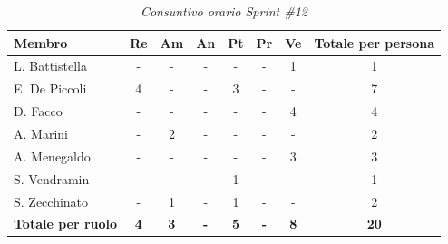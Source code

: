 ﻿\documentclass[a4paper, 10pt, colorlinks=true, linkcolor=black, urlcolor=blue, citecolor=blue, hidelinks]{article}
\renewcommand{\arraystretch}{1.2}
\begin{document}
\begin{table}[H]
    \centering
    \renewcommand{\arraystretch}{1.4}
    \begin{tabular}{|l|c|c|c|c|c|c|c|}
        \hline
        \rowcolor{bluBitless!15}
        \textbf{Membro} & \textbf{Re} & \textbf{Am} & \textbf{An} & \textbf{Pt} & \textbf{Pr} & \textbf{Ve} & \textbf{Totale per persona} \\
        \hline
        L. Battistella & - & - & - & - & - & 1 & 1 \\ \hline
        E. De Piccoli & 4 & - & - & 3 & - & - & 7 \\ \hline
        D. Facco & - & - & - & - & - & 4 & 4 \\ \hline
        A. Marini & - & 2 & - & - & - & - & 2 \\ \hline
        A. Menegaldo & - & - & - & - & - & 3 & 3 \\ \hline
        S. Vendramin & - & - & - & 1 & - & - & 1 \\ \hline
        S. Zecchinato & - & 1 & - & 1 & - & - & 2 \\ \hline
        \rowcolor{bluBitless!8}
        \textbf{Totale per ruolo} & \textbf{4} & \textbf{3} & \textbf{-} & \textbf{5} & \textbf{-} & \textbf{8} & \textbf{20} \\
        \hline
    \end{tabular}
    \caption{\textit{Consuntivo orario Sprint \#12}}
\end{table}
\end{document}
